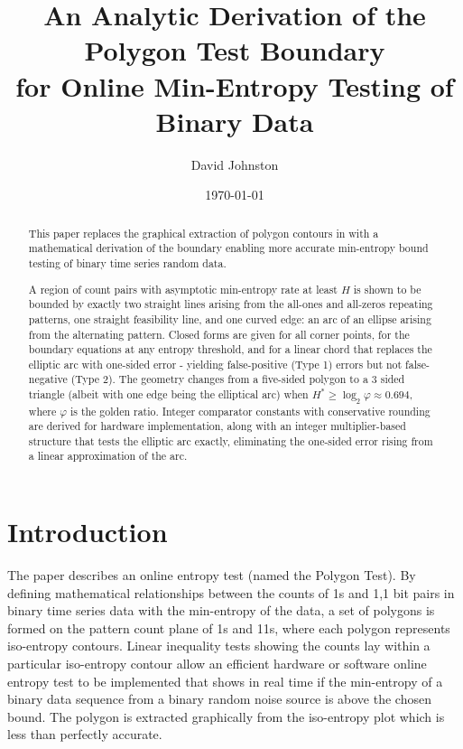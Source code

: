 \documentclass[11pt]{article}
\title{An Analytic Derivation of the Polygon Test Boundary\\
for Online Min-Entropy Testing of Binary Data}
\author{David Johnston}
\date{\today}
\begin{document}
\maketitle

\begin{abstract}

This paper replaces the graphical extraction of polygon contours in \cite{johnston2024} 
with a mathematical derivation of the
boundary enabling more accurate min-entropy bound testing of binary time series
random data.

A region of count pairs with asymptotic min-entropy rate at least
$H$ is shown to be bounded by exactly two straight lines arising from the
all-ones and all-zeros repeating patterns, one straight feasibility line, and
one curved edge: an arc of an ellipse arising from the alternating
pattern. Closed forms are given for all corner points, for the boundary
equations at any entropy threshold, and for a  linear chord that
replaces the elliptic arc with one-sided error - yielding false-positive (Type 1) errors
but not false-negative (Type 2). The geometry changes from
a five-sided polygon to a 3 sided triangle (albeit with one edge being the
elliptical arc) when  $H^\ast \geq \log_2\varphi\approx 0.694$, where $\varphi$ is the
golden ratio. Integer comparator constants with conservative
rounding are derived for hardware implementation, along with an integer 
multiplier-based structure that tests the elliptic arc exactly, eliminating
the one-sided error rising from a linear approximation of the arc.
\end{abstract}

\section{Introduction}

The paper\cite{johnston2024} describes an online entropy test (named the 
Polygon Test). By defining mathematical relationships between the counts
of 1s and 1,1 bit pairs in binary time series data with the min-entropy
of the data, a set of polygons is formed on the pattern count plane of 
1s and 11s, where each polygon represents iso-entropy contours. Linear
inequality tests showing the counts lay within a particular iso-entropy
contour allow an efficient hardware or software online entropy test
to be implemented that shows in real time if the min-entropy of a
binary data sequence from a binary random noise source is above
the chosen bound. The polygon is extracted graphically from the
iso-entropy plot which is less than perfectly accurate.
\end{document}
